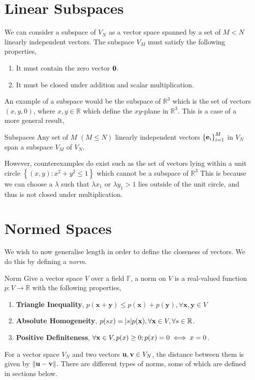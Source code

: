 \documentclass{book}
\begin{document}
\section{Linear Subspaces}
We can consider a subspace of $V_N$ as a vector space spanned by a set of $M < N$ linearly independent vectors. The subspace $V_M$ must satisfy the following properties,
\begin{enumerate}
	\item It must contain the zero vector $\vb{0}$.
	\item It must be closed under addition and scalar multiplication.
\end{enumerate}
An example of a subspace would be the subspace of $\mathbb{R}^3$ which is the set of vectors $(x,y,0)$, where $x,y \in \mathbb{R}$ which define the $xy$-plane in $\mathbb{R}^3$. This is a case of a more general result,
\begin{Theorems}{Subspaces}{}
	Any set of $M$ $(M \leq N)$ linearly independent vectors $\left\{\vb{e}_i\right\}^M_{i=1}$ in $V_N$ span a subspace $V_M$ of $V_N$.
\end{Theorems}
However, counterexamples do exist such as the set of vectors lying within a unit circle $\left\{(x,y):x^2+y^2 \leq 1\right\}$ which cannot be a subspace of $\mathbb{R}^3$ This is because we can choose a $\lambda$ such that $\lambda x_1$ or $\lambda y_1 > 1$ lies outside of the unit circle, and thus is not closed under multiplication.
\section{Normed Spaces}
We wish to now generalise length in order to define the closeness of vectors. We do this by defining a \textit{norm}.
\begin{Definitions}{Norm}{}
	Give a vector space $V$ over a field $\mathbb{F}$, a norm on $V$ is a real-valued function $p : V \to \mathbb{R}$ with the following properties,
	\begin{enumerate}
		\item \textbf{Triangle Inequality}, $p(\mathbf{x} + \mathbf{y}) \leq p(\mathbf{x}) + p(\mathbf{y}), \forall \mathbf{x}, \mathbf{y} \in V$
		\item \textbf{Absolute Homogeneity}, $p(sx) = \abs{s}p(\vb{x}), \forall \mathbf{x} \in V, \forall s \in \mathbb{R}$.
		\item \textbf{Positive Definiteness}, $\forall \vb{x} \in V, p(x) \geq 0; p(x) = 0 \iff x = 0$.
	\end{enumerate}
\end{Definitions}
For a vector space $V_N$ and two vectors $\vb{u},\vb{v} \in V_N$, the distance between them is given by $\norm{\vb{u} - \vb{v}}$. There are different types of norms, some of which are defined in sections below. 
\end{document}
